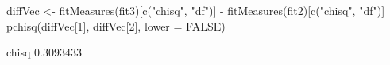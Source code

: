 \begin{Schunk}
\begin{Sinput}
 diffVec <- fitMeasures(fit3)[c("chisq", "df")] -
     fitMeasures(fit2)[c("chisq", "df")]
 pchisq(diffVec[1], diffVec[2], lower = FALSE)
\end{Sinput}
\begin{Soutput}
    chisq 
0.3093433 
\end{Soutput}
\end{Schunk}
